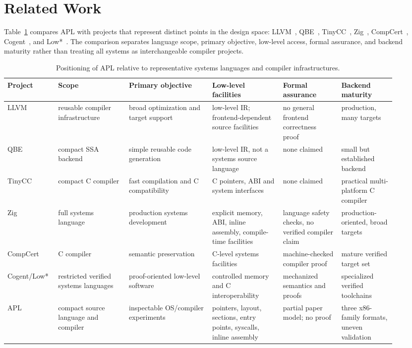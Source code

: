 \documentclass[10pt,twocolumn]{article}
\begin{document}
\section{Related Work}

\par Table~\ref{tab:related-comparison} compares APL with projects that represent distinct points in the design space: LLVM~\cite{lattner2004llvm}, QBE~\cite{qbe}, TinyCC~\cite{tinycc}, Zig~\cite{ziglangref}, CompCert~\cite{leroy2009compcert,compcert}, Cogent~\cite{oconnor2016cogent}, and Low*~\cite{protzenko2017lowstar}. The comparison separates language scope, primary objective, low-level access, formal assurance, and backend maturity rather than treating all systems as interchangeable compiler projects.

\begin{table}[t]
\centering
\footnotesize
\setlength{\tabcolsep}{3pt}
\caption{Positioning of APL relative to representative systems languages and compiler infrastructures.}
\label{tab:related-comparison}
\begin{tabular}{p{0.10\linewidth}p{0.17\linewidth}p{0.20\linewidth}p{0.17\linewidth}p{0.14\linewidth}p{0.13\linewidth}}
\toprule
Project & Scope & Primary objective & Low-level facilities & Formal assurance & Backend maturity \\
\midrule
LLVM & reusable compiler infrastructure & broad optimization and target support & low-level IR; frontend-dependent source facilities & no general frontend correctness proof & production, many targets \\
QBE & compact SSA backend & simple reusable code generation & low-level IR, not a systems source language & none claimed & small but established backend \\
TinyCC & compact C compiler & fast compilation and C compatibility & C pointers, ABI and system interfaces & none claimed & practical multi-platform C compiler \\
Zig & full systems language & production systems development & explicit memory, ABI, inline assembly, compile-time facilities & language safety checks, no verified compiler claim & production-oriented, broad targets \\
CompCert & C compiler & semantic preservation & C-level systems facilities & machine-checked compiler proof & mature verified target set \\
Cogent/Low* & restricted verified systems languages & proof-oriented low-level software & controlled memory and C interoperability & mechanized semantics and proofs & specialized verified toolchains \\
APL & compact source language and compiler & inspectable OS/compiler experiments & pointers, layout, sections, entry points, syscalls, inline assembly & partial paper model; no proof & three x86-family formats, uneven validation \\
\bottomrule
\end{tabular}
\end{table}
\end{document}

